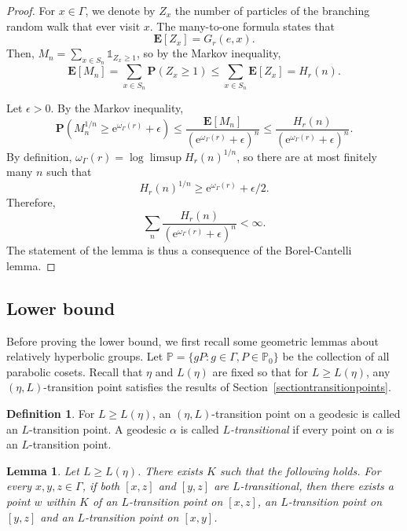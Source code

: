 \documentclass{amsart}
\newtheorem{lem}[thm]{Lemma}
\theoremstyle{definition}
\newtheorem{defn}[thm]{Definition}
\theoremstyle{remark}
\begin{document}
\begin{proof}
For $x\in \Gamma$, we denote by $Z_x$ the number of particles of the branching random walk that ever visit $x$.
The many-to-one formula states that
$$\mathbf E[Z_x]=G_r(e,x).$$
Then,
$M_n=\sum_{x\in S_n}\mathbb{1}_{Z_x\geq 1}$, so by the Markov inequality,
$$\mathbf E[M_n]=\sum_{x\in S_n}\mathbf P (Z_x\geq 1)\leq \sum_{x\in S_n}\mathbf E[Z_x]=H_r(n).$$

Let $\epsilon>0$.
By the Markov inequality,
$$\mathbf{P}\left (M_n^{1/n}\geq \mathrm{e}^{\omega_\Gamma(r)}+\epsilon\right)\leq \frac{\mathbf{E}[M_n]}{(\mathrm{e}^{\omega_\Gamma(r)}+\epsilon)^n}\leq \frac{H_r(n)}{(\mathrm{e}^{\omega_\Gamma(r)}+\epsilon)^n}.$$
By definition,
$\omega_\Gamma(r)=\log \limsup H_r(n)^{1/n}$,
so there are at most finitely many $n$ such that
$$H_r(n)^{1/n}\geq \mathrm{e}^{\omega_\Gamma(r)}+\epsilon/2.$$
Therefore,
$$\sum_n \frac{H_r(n)}{(\mathrm{e}^{\omega_\Gamma(r)}+\epsilon)^n}<\infty.$$
The statement of the lemma is thus a consequence of the Borel-Cantelli lemma.
\end{proof}

\subsection{Lower bound}
Before proving the lower bound, we first recall some geometric lemmas about relatively hyperbolic groups.
Let $\mathbb P=\{gP: g\in \Gamma, P\in\mathbb P_0\}$ be the collection of all parabolic cosets.
 Recall that $\eta$ and $L(\eta)$ are fixed so that for $L\geq L(\eta)$, any $(\eta,L)$-transition point satisfies the results of Section~\ref{sectiontransitionpoints}.



\begin{defn}\label{deftransitional}
For $L\geq L(\eta)$, an $(\eta,L)$-transition point on a geodesic is called an $L$-transition point.
A geodesic $\alpha$ is called \textit{$L$-transitional} if every point on $\alpha$ is an $L$-transition point.
\end{defn}



\begin{lem}\label{RelThinTriangleLem2}
Let $L\geq L(\eta)$.
There exists $K$ such that the following holds.
For every $x,y,z\in \Gamma$,
if both $[x,z]$ and $[y,z]$ are $L$-transitional, then there exists a point $w$ within $K$ of an $L$-transition point on $[x,z]$, an $L$-transition point on $[y,z]$ and an $L$-transition point on $[x,y]$.
\end{lem}
\end{document}
